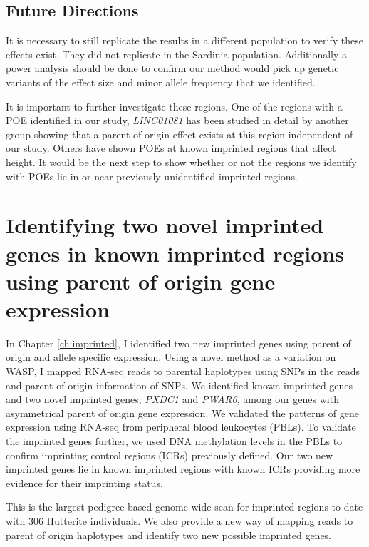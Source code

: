  \subsection{Future Directions}
It is necessary to still replicate the results in a different population to verify these effects exist. They did not replicate in the Sardinia population. Additionally a power analysis should be done to confirm our method would pick up genetic variants of the effect size and minor allele frequency that we identified.

It is important to further investigate these regions. One of the regions with a POE identified in our study, \emph{LINC01081} has been studied in detail by another group showing that a parent of origin effect exists at this region independent of our study\cite{Szafranski:2016fz}. Others have shown POEs at known imprinted regions that affect height\cite{Benonisdottir:2016dz,Zoledziewska:2015do}. It would be the next step to show whether or not the regions we identify with POEs lie in or near previously unidentified imprinted regions.
 
\section{Identifying two novel imprinted genes in known imprinted regions using parent of origin gene expression}

 In Chapter \ref{ch:imprinted}, I identified two new imprinted genes using parent of origin and allele specific expression. Using a novel method as a variation on WASP\cite{vandeGeijn:2015hi}, I mapped RNA-seq reads to parental haplotypes using SNPs in the reads and parent of origin information of SNPs. We identified known imprinted genes and two novel imprinted genes, \emph{PXDC1} and \emph{PWAR6}, among our genes with asymmetrical parent of origin gene expression. We validated the patterns of gene expression using RNA-seq from peripheral blood leukocytes (PBLs). To validate the imprinted genes further, we used DNA methylation levels in the PBLs to confirm imprinting control regions (ICRs) previously defined\cite{Joshi:2016bb,Court:2014kc}. Our two new imprinted genes lie in known imprinted regions with known ICRs providing more evidence for their imprinting status.
 
This is the largest pedigree based genome-wide scan for imprinted regions to date with 306 Hutterite individuals. We also provide a new way of mapping reads to parent of origin haplotypes and identify two new possible imprinted genes.


